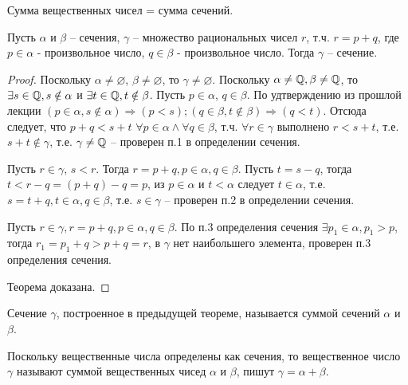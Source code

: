 \documentclass[main]{subfiles}
\begin{document}
\begin{definition}
    Сумма вещественных чисел = сумма сечений.
\end{definition}
\begin{theorem}
    Пусть $\alpha$ и $\beta$ -- сечения, $\gamma$ -- множество рациональных чисел
    $r$, т.ч. $r = p + q$, где $p \in \alpha$ - произвольное число,
    $q \in \beta$ - произвольное число. Тогда $\gamma$ -- сечение.
\end{theorem}
\begin{proof}
    Поскольку $\alpha \neq \varnothing$, $\beta \neq \varnothing$, то
    $\gamma \neq \varnothing$. Поскольку $\alpha \neq \mathbb{Q}, \beta \neq \mathbb{Q}$, то
    $\exists s \in \mathbb{Q}, s \notin \alpha$ и $\exists t \in \mathbb{Q}, t \notin \beta$.
    Пусть $p \in \alpha$, $q \in \beta$.
    По удтверждению из прошлой лекции $(p \in \alpha, s \notin \alpha) \Rightarrow
        (p < s); (q \in \beta, t \notin \beta) \Rightarrow (q < t)$.
    Отсюда следует, что $p + q < s + t$ $\forall p \in \alpha \wedge
        \forall q \in \beta$, т.ч. $\forall r \in \gamma$ выполнено $r < s + t$, т.е.
    $s + t \notin \gamma$, т.е. $\gamma \neq \mathbb{Q}$ -- проверен п.1 в определении
    сечения.

    Пусть $r \in \gamma$, $s < r$. Тогда $r = p + q, p \in \alpha, q \in \beta$.
    Пусть $t = s - q$, тогда $t < r - q = (p + q) - q = p$, из $p \in \alpha$ и
    $t < \alpha$ следует $t \in \alpha$, т.е. $s = t + q, t \in \alpha,
        q \in \beta$, т.е. $s \in \gamma$ -- проверен п.2 в определении сечения.

    Пусть $r \in \gamma, r = p + q, p \in \alpha, q \in \beta$. По п.3
    определения сечения $\exists p_1 \in \alpha, p_1 > p$, тогда
    $r_1 = p_1 + q > p + q = r$, в $\gamma$ нет наибольшего элемента, проверен
    п.3 определения сечения.

    Теорема доказана.
\end{proof}

\begin{definition}
    Сечение $\gamma$, построенное в предыдущей теореме, называется суммой
    сечений $\alpha$ и $\beta$.

    Поскольку вещественные числа определены как сечения, то вещественное число
    $\gamma$ называют суммой вещественных чисед $\alpha$ и $\beta$, пишут
    $\gamma = \alpha + \beta$.
\end{definition}
\end{document}
